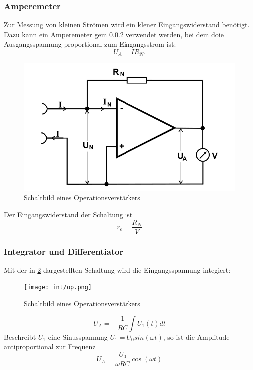 \subsubsection{Amperemeter}
Zur Messung von kleinen Strömen wird ein klener Eingangswiderstand benötigt. Dazu kann ein Amperemeter gem \ref{} verwendet werden, bei dem doie Ausgangsspannung proportional zum Eingangsstrom ist:
\begin{equation}
U_A = IR_N.
\end{equation}
\begin{figure}
 	\centering
 	\includegraphics[width=\textwidth]{img/ampere.png}
 	\caption{Schaltbild eines Operationsverstärkers}
 	\label{abb:ampere}
\end{figure}
Der Eingangswiderstand der Schaltung ist
\begin{equation}
r_e = \frac{R_N}{V}
\end{equation}

\subsubsection{Integrator und Differentiator}
Mit der in \ref{abb:int} dargestellten Schaltung wird die Eingangsspannung integiert:
\begin{figure}
 	\centering
 	\texttt{[image: int/op.png]}
 	\caption{Schaltbild eines Operationsverstärkers}
 	\label{abb:int}
\end{figure}
\begin{equation}
U_A = - \frac{1}{RC} \int U_1(t)dt
\end{equation}
Beschreibt $U_1$ eine Sinusspannung $U_1 = U_0 sin(\omega t)$, so ist die Amplitude antiproportional zur Frequenz
\begin{equation}
U_A = \frac{U_0}{\omega RC} \cos(\omega t)
\end{equation}

